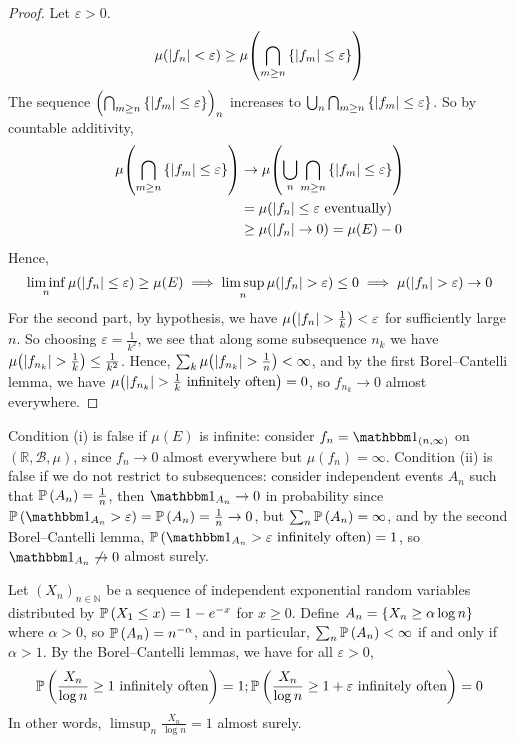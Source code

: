\begin{proof}
	Let \( \varepsilon > 0 \).
	\[ \mu(\abs{f_n} < \varepsilon) \geq \mu\qty(\bigcap_{m \geq n} \qty{\abs{f_m} \leq \varepsilon}) \]
	The sequence \( \qty(\bigcap_{m \geq n} \qty{\abs{f_m} \leq \varepsilon})_n \) increases to \( \bigcup_n \bigcap_{m \geq n} \qty{\abs{f_m} \leq \varepsilon} \).
	So by countable additivity,
	\begin{align*}
		\mu\qty(\bigcap_{m \geq n} \qty{\abs{f_m} \leq \varepsilon}) &\to \mu\qty(\bigcup_n \bigcap_{m \geq n} \qty{\abs{f_m} \leq \varepsilon}) \\
		&= \mu\qty(\abs{f_n} \leq \varepsilon \text{ eventually}) \\
		&\geq \mu(\abs{f_n} \to 0) = \mu(E) - 0
	\end{align*}
	Hence,
	\[ \liminf_n \mu(\abs{f_n} \leq \varepsilon) \geq \mu(E) \implies \limsup_n \mu(\abs{f_n} > \varepsilon) \leq 0 \implies \mu(\abs{f_n} > \varepsilon) \to 0 \]
	For the second part, by hypothesis, we have \( \mu\qty(\abs{f_n} > \frac{1}{k}) < \varepsilon \) for sufficiently large \( n \).
	So choosing \( \varepsilon = \frac{1}{k^2} \), we see that along some subsequence \( n_k \) we have \( \mu\qty(\abs{f_{n_k}} > \frac{1}{k}) \leq \frac{1}{k^2} \).
	Hence, \( \sum_k \mu\qty(\abs{f_{n_k}} > \frac{1}{n}) < \infty \), and by the first Borel--Cantelli lemma, we have \( \mu\qty(\abs{f_{n_k}} > \frac{1}{k} \text{ infinitely often}) = 0 \), so \( f_{n_k} \to 0 \) almost everywhere.
\end{proof}
\begin{remark}
	Condition (i) is false if \( \mu(E) \) is infinite: consider \( f_n = \mathbbm 1_{(n,\infty)} \) on \( (\mathbb R,\mathcal B,\mu) \), since \( f_n \to 0 \) almost everywhere but \( \mu(f_n) = \infty \).
	Condition (ii) is false if we do not restrict to subsequences: consider independent events \( A_n \) such that \( \mathbb{P}\left({A_n}\right) = \frac{1}{n} \), then \( \mathbbm 1_{A_n} \to 0 \) in probability since \( \prob{\mathbbm 1_{A_n} > \varepsilon} = \prob{A_n} = \frac{1}{n} \to 0 \), but \( \sum_n \mathbb{P}\left({A_n}\right) = \infty \), and by the second Borel--Cantelli lemma, \( \prob{\mathbbm 1_{A_n} > \varepsilon \text{ infinitely often}} = 1 \), so \( \mathbbm 1_{A_n} \not\to 0 \) almost surely.
\end{remark}
\begin{example}
	Let \( (X_n)_{n \in \mathbb N} \) be a sequence of independent exponential random variables distributed by \( \mathbb{P}\left({X_1 \leq x}\right) = 1 - e^{-x} \) for \( x \geq 0 \).
	Define \( A_n = \qty{X_n \geq \alpha \log n} \) where \( \alpha > 0 \), so \( \mathbb{P}\left({A_n}\right) = n^{-\alpha} \), and in particular, \( \sum_n \mathbb{P}\left({A_n}\right) < \infty \) if and only if \( \alpha > 1 \).
	By the Borel--Cantelli lemmas, we have for all \( \varepsilon > 0 \),
	\[ \mathbb{P}\left({\frac{X_n}{\log n} \geq 1 \text{ infinitely often}}\right) = 1; \mathbb{P}\left({\frac{X_n}{\log n} \geq 1 + \varepsilon \text{ infinitely often}}\right) = 0 \]
	In other words, \( \limsup_n \frac{X_n}{\log n} = 1 \) almost surely.
\end{example}

